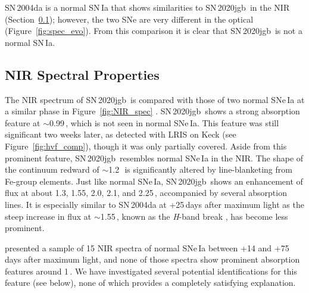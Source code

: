 \documentclass[twocolumn]{aastex631}
\newcommand{\sn}{SN\,2020jgb}
\begin{document}
SN\,2004da is a normal SN\,Ia that shows similarities to \sn\ in the NIR (Section~\ref{sec:NIR_spec}); however, the two SNe are very different in the optical (Figure~\ref{fig:spec_evo}). From this comparison it is clear that \sn\ is not a normal SN\,Ia. 

\subsection{NIR Spectral Properties}
\label{sec:NIR_spec}
The NIR spectrum of \sn\ is compared with those of two normal SNe\,Ia at a similar phase in Figure~\ref{fig:NIR_spec} \citep[data for SNe\,2004ab and 2004da from][]{Marion2009_NIR}. \sn\ shows a strong absorption feature at $\sim$0.99\,\micron, which is not seen in normal SNe\,Ia. This feature was still significant two weeks later, as detected with LRIS on Keck (see Figure~\ref{fig:hvf_comp}), though it was only partially covered. Aside from this prominent feature, \sn\ resembles normal SNe\,Ia in the NIR. The shape of the continuum redward of $\sim$1.2\,\micron\ is significantly altered by line-blanketing from Fe-group elements. Just like normal SNe\,Ia, \sn\ shows an enhancement of flux at about 1.3, 1.55, 2.0, 2.1, and 2.25\,\micron, accompanied by several  absorption lines. It is especially similar to SN\,2004da at +25\,days after maximum light as the steep increase in flux at $\sim$1.55\,\micron, known as the \textit{H}-band break \citep{Hsiao_CSP_2019}, has become less prominent.

\citet{Marion2009_NIR} presented a sample of 15 NIR spectra of normal SNe\,Ia between +14 and +75\,days after maximum light, and none of those spectra show prominent absorption features around 1\,\micron. We have investigated several potential identifications for this feature (see below), none of which provides a completely satisfying explanation.
\end{document}
